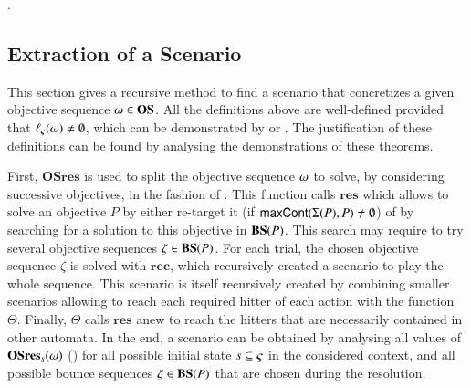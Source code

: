 .


\subsection{Extraction of a Scenario}
\label{ssec:concret}

This section gives a recursive method to find a scenario that concretizes
a given objective sequence $\omega \in \mathbf{OS}$.
All the definitions above are well-defined provided that
$\ell_\varsigma(\omega)\neq\emptyset$,
which can be demonstrated by  or .
The justification of these definitions can be found by analysing the demonstrations
of these theorems.

\newcommand{\res}{\mathbf{res}}
\newcommand{\osres}{\mathbf{OSres}}
\newcommand{\autoBS}{\mathbf{autoBS}}
\newcommand{\rec}{\mathbf{rec}}
\newcommand{\thisobj}{P}
\newcommand{\thisseq}{\Theta}
\newcommand{\R}{R}

First, $\osres$ is used to split the objective sequence $\omega$ to solve,
by considering successive objectives, in the fashion of .
This function calls $\res$ which allows to solve an objective $P$
by either re-target it (if $\mathsf{maxCont}(\Sigma(P), P) \neq \emptyset$)
of by searching for a solution to this objective in $\mathbf{BS}(P)$.
This search may require to try several objective sequences $\zeta \in \mathbf{BS}(P)$.
For each trial, the chosen objective sequence $\zeta$ is solved with $\rec$,
which recursively created a scenario to play the whole sequence.
This scenario is itself recursively created by combining
smaller scenarios allowing to reach each required hitter of each action
with the function $\thisseq$.
Finally, $\thisseq$ calls $\res$ anew to reach the hitters
that are necessarily contained in other automata.
In the end, a scenario can be obtained by analysing all values of
$\osres_s(\w)$ ()
for all possible initial state $s \subseteq \varsigma$ in the considered context,
and all possible bounce sequences $\zeta \in \mathbf{BS}(P)$ that are chosen during the resolution.

